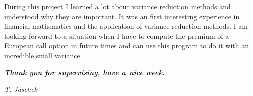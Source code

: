 \documentclass[12pt,a4paper]{scrartcl}
\begin{document}
\noindent During this project I learned a lot about variance reduction methods and understood why they are important. It was an first interesting experience in financial mathematics and the application of variance reduction methods. I am looking forward to a situation when I have to compute the premium of a European call option in future times and can use this program to do it with an incredible small variance.\\

\vspace{17cm}
\centerline{\textbf{\emph{Thank you for supervising, have a nice week.}}}
\centerline{\textit{T. Jaschek}}
\end{document}

